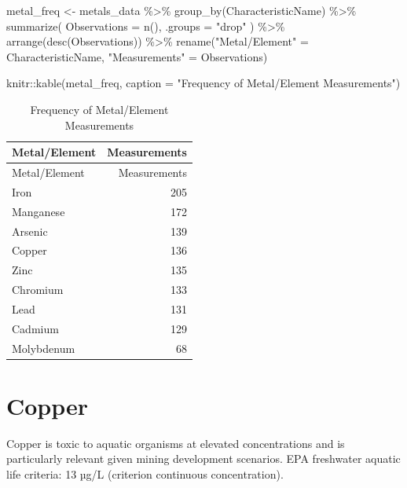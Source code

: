 \documentclass[
  letterpaper,
]{scrbook}
\newenvironment{Shaded}{\begin{snugshade}}{\end{snugshade}}
\newcommand{\AttributeTok}[1]{\textcolor[rgb]{0.40,0.45,0.13}{#1}}
\newcommand{\FunctionTok}[1]{\textcolor[rgb]{0.28,0.35,0.67}{#1}}
\newcommand{\NormalTok}[1]{\textcolor[rgb]{0.00,0.23,0.31}{#1}}
\newcommand{\OtherTok}[1]{\textcolor[rgb]{0.00,0.23,0.31}{#1}}
\newcommand{\SpecialCharTok}[1]{\textcolor[rgb]{0.37,0.37,0.37}{#1}}
\newcommand{\StringTok}[1]{\textcolor[rgb]{0.13,0.47,0.30}{#1}}
\begin{document}
\begin{Shaded}
\begin{Highlighting}[]
\NormalTok{metal\_freq }\OtherTok{\textless{}{-}}\NormalTok{ metals\_data }\SpecialCharTok{\%\textgreater{}\%}
  \FunctionTok{group\_by}\NormalTok{(CharacteristicName) }\SpecialCharTok{\%\textgreater{}\%}
  \FunctionTok{summarize}\NormalTok{(}
    \AttributeTok{Observations =} \FunctionTok{n}\NormalTok{(),}
    \AttributeTok{.groups =} \StringTok{"drop"}
\NormalTok{  ) }\SpecialCharTok{\%\textgreater{}\%}
  \FunctionTok{arrange}\NormalTok{(}\FunctionTok{desc}\NormalTok{(Observations)) }\SpecialCharTok{\%\textgreater{}\%}
  \FunctionTok{rename}\NormalTok{(}\StringTok{"Metal/Element"} \OtherTok{=}\NormalTok{ CharacteristicName, }\StringTok{"Measurements"} \OtherTok{=}\NormalTok{ Observations)}

\NormalTok{knitr}\SpecialCharTok{::}\FunctionTok{kable}\NormalTok{(metal\_freq, }\AttributeTok{caption =} \StringTok{"Frequency of Metal/Element Measurements"}\NormalTok{)}
\end{Highlighting}
\end{Shaded}

\begin{longtable}[]{@{}lr@{}}
\caption{Frequency of Metal/Element Measurements}\tabularnewline
\toprule\noalign{}
Metal/Element & Measurements \\
\midrule\noalign{}
\endfirsthead
\toprule\noalign{}
Metal/Element & Measurements \\
\midrule\noalign{}
\endhead
\bottomrule\noalign{}
\endlastfoot
Iron & 205 \\
Manganese & 172 \\
Arsenic & 139 \\
Copper & 136 \\
Zinc & 135 \\
Chromium & 133 \\
Lead & 131 \\
Cadmium & 129 \\
Molybdenum & 68 \\
\end{longtable}

\section{Copper}\label{copper}

Copper is toxic to aquatic organisms at elevated concentrations and is
particularly relevant given mining development scenarios. EPA freshwater
aquatic life criteria: 13 µg/L (criterion continuous concentration).
\end{document}
